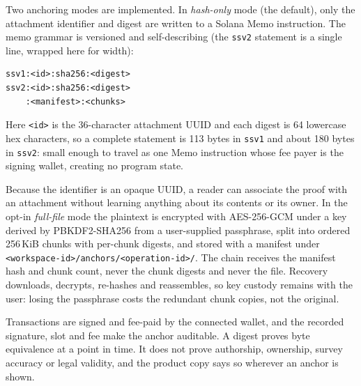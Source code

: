 \documentclass[10pt,a4paper,twocolumn]{article}
\begin{document}
Two anchoring modes are implemented. In \emph{hash-only} mode (the default),
only the attachment identifier and digest are written to a Solana Memo instruction.
The memo grammar is versioned and self-describing (the \texttt{ssv2} statement is a
single line, wrapped here for width):

\begin{verbatim}
ssv1:<id>:sha256:<digest>
ssv2:<id>:sha256:<digest>
    :<manifest>:<chunks>
\end{verbatim}

\noindent Here \texttt{<id>} is the 36-character attachment UUID and each digest is
64 lowercase hex characters, so a complete statement is 113 bytes in \texttt{ssv1}
and about 180 bytes in \texttt{ssv2}: small enough to travel as one Memo instruction
whose fee payer is the signing wallet, creating no program state.

Because the identifier is an opaque UUID, a reader can associate the proof with an
attachment without learning anything about its contents or its owner. In the opt-in
\emph{full-file} mode the plaintext is encrypted with AES-256-GCM
\cite{sp800-38d} under a key derived by PBKDF2-SHA256 \cite{rfc8018} from a
user-supplied passphrase, split into ordered 256\,KiB chunks
with per-chunk digests, and stored with a manifest under
\texttt{<workspace-id>/anchors/<operation-id>/}. The chain receives the manifest hash
and chunk count, never the chunk digests and never the file. Recovery downloads,
decrypts, re-hashes and reassembles, so key custody remains with the user: losing the
passphrase costs the redundant chunk copies, not the original.

Transactions are signed and fee-paid by the connected wallet, and the recorded
signature, slot and fee make the anchor auditable. A digest proves byte equivalence
at a point in time. It does not prove authorship, ownership, survey accuracy or legal
validity, and the product copy says so wherever an anchor is shown.
\end{document}
